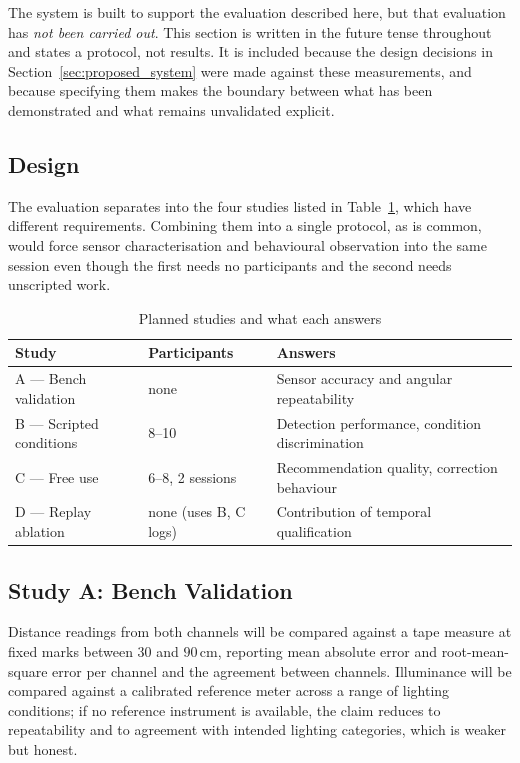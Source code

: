 The system is built to support the evaluation described here, but that evaluation has \emph{not
been carried out}. This section is written in the future tense throughout and states a protocol,
not results. It is included because the design decisions in Section~\ref{sec:proposed_system} were
made against these measurements, and because specifying them makes the boundary between what has
been demonstrated and what remains unvalidated explicit.

\subsection{Design}

The evaluation separates into the four studies listed in Table~\ref{tab:studies}, which have different requirements. Combining them into a
single protocol, as is common, would force sensor characterisation and behavioural observation into
the same session even though the first needs no participants and the second needs unscripted work.

\begin{table}[htbp]
\centering
\caption{Planned studies and what each answers}
\label{tab:studies}
\begin{tabular}{@{}llp{6.0cm}@{}}
\toprule
\textbf{Study} & \textbf{Participants} & \textbf{Answers} \\
\midrule
A --- Bench validation      & none              & Sensor accuracy and angular repeatability \\
B --- Scripted conditions   & 8--10             & Detection performance, condition discrimination \\
C --- Free use              & 6--8, 2 sessions  & Recommendation quality, correction behaviour \\
D --- Replay ablation       & none (uses B, C logs) & Contribution of temporal qualification \\
\bottomrule
\end{tabular}
\end{table}

\subsection{Study A: Bench Validation}

Distance readings from both channels will be compared against a tape measure at fixed marks between
$30$ and $90\,\text{cm}$, reporting mean absolute error and root-mean-square error per channel and
the agreement between channels. Illuminance will be compared against a calibrated reference meter
across a range of lighting conditions; if no reference instrument is available, the claim reduces
to repeatability and to agreement with intended lighting categories, which is weaker but honest.

